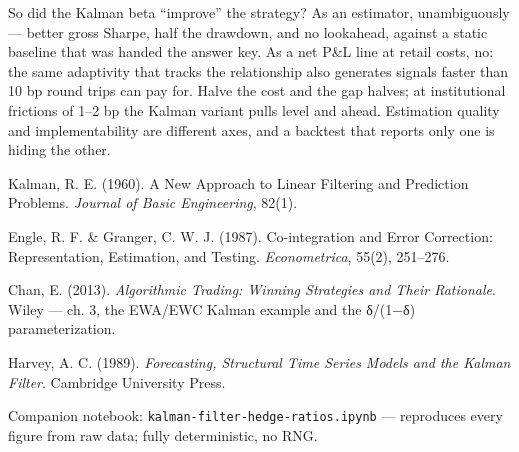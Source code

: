 \documentclass{pyportfolios-note}
\begin{document}
So did the Kalman beta ``improve'' the strategy? As an estimator, unambiguously —
better gross Sharpe, half the drawdown, and no lookahead, against a static
baseline that was handed the answer key. As a net P\&L line at retail costs, no:
the same adaptivity that tracks the relationship also generates signals faster
than 10 bp round trips can pay for. Halve the cost and the gap halves; at
institutional frictions of 1–2 bp the Kalman variant pulls level and ahead.
Estimation quality and implementability are different axes, and a backtest that
reports only one is hiding the other.


\noteneedroom{190bp}
\begin{notereferences}
\item Kalman, R. E. (1960). A New Approach to Linear Filtering and Prediction
      Problems. \textit{Journal of Basic Engineering}, 82(1).
\item Engle, R. F. \& Granger, C. W. J. (1987). Co-integration and Error
      Correction: Representation, Estimation, and Testing.
      \textit{Econometrica}, 55(2), 251–276.
\item Chan, E. (2013). \textit{Algorithmic Trading: Winning Strategies and Their
      Rationale}. Wiley — ch. 3, the EWA/EWC Kalman example and the δ/(1−δ)
      parameterization.
\item Harvey, A. C. (1989). \textit{Forecasting, Structural Time Series Models
      and the Kalman Filter}. Cambridge University Press.
\item Companion notebook: \texttt{kalman-filter-hedge-ratios.ipynb} —
      reproduces every figure from raw data; fully deterministic, no RNG.
\end{notereferences}
\end{document}
